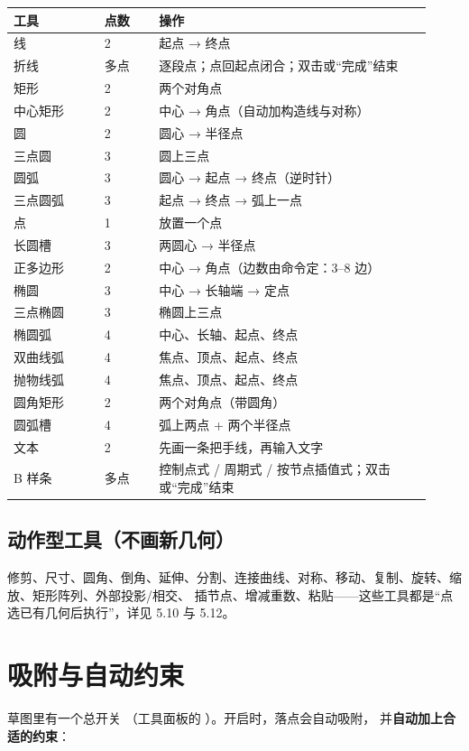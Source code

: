 \begin{longtable}{@{}p{0.20\linewidth}p{0.12\linewidth}p{0.60\linewidth}@{}}
\toprule \textbf{工具} & \textbf{点数} & \textbf{操作} \\ \midrule \endhead
线 & 2 & 起点 → 终点 \\
折线 & 多点 & 逐段点；点回起点闭合；双击或“完成”结束 \\
矩形 & 2 & 两个对角点 \\
中心矩形 & 2 & 中心 → 角点（自动加构造线与对称）\\
圆 & 2 & 圆心 → 半径点 \\
三点圆 & 3 & 圆上三点 \\
圆弧 & 3 & 圆心 → 起点 → 终点（逆时针）\\
三点圆弧 & 3 & 起点 → 终点 → 弧上一点 \\
点 & 1 & 放置一个点 \\
长圆槽 & 3 & 两圆心 → 半径点 \\
正多边形 & 2 & 中心 → 角点（边数由命令定：3--8 边）\\
椭圆 & 3 & 中心 → 长轴端 → 定点 \\
三点椭圆 & 3 & 椭圆上三点 \\
椭圆弧 & 4 & 中心、长轴、起点、终点 \\
双曲线弧 & 4 & 焦点、顶点、起点、终点 \\
抛物线弧 & 4 & 焦点、顶点、起点、终点 \\
圆角矩形 & 2 & 两个对角点（带圆角）\\
圆弧槽 & 4 & 弧上两点 + 两个半径点 \\
文本 & 2 & 先画一条把手线，再输入文字 \\
B 样条 & 多点 & 控制点式 / 周期式 / 按节点插值式；双击或“完成”结束 \\
\bottomrule
\end{longtable}

\subsection{动作型工具（不画新几何）}

修剪、尺寸、圆角、倒角、延伸、分割、连接曲线、对称、移动、复制、旋转、缩放、矩形阵列、外部投影/相交、
插节点、增减重数、粘贴——这些工具都是“点选已有几何后执行”，详见 5.10 与 5.12。

\section{吸附与自动约束}

草图里有一个总开关 （工具面板的 ）。开启时，落点会自动吸附，
并\textbf{自动加上合适的约束}：

